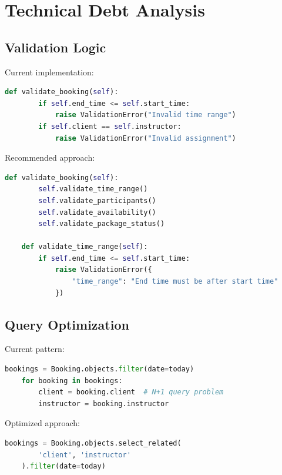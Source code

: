 \section{Technical Debt Analysis}

\begin{tcolorbox}[
    enhanced,
    title={Code Quality Issues},
    attach boxed title to top left,
    boxed title style={
        colback=warning!50,
        colframe=warning!50,
        arc=0mm,
    },
    colback=white,
    colframe=warning!50,
    arc=0mm,
    fonttitle=\bfseries
]
    \subsection{Validation Logic}
    Current implementation:
    \begin{lstlisting}[language=Python]
    def validate_booking(self):
        if self.end_time <= self.start_time:
            raise ValidationError("Invalid time range")
        if self.client == self.instructor:
            raise ValidationError("Invalid assignment")
    \end{lstlisting}
    
    Recommended approach:
    \begin{lstlisting}[language=Python]
    def validate_booking(self):
        self.validate_time_range()
        self.validate_participants()
        self.validate_availability()
        self.validate_package_status()
    
    def validate_time_range(self):
        if self.end_time <= self.start_time:
            raise ValidationError({
                "time_range": "End time must be after start time"
            })
    \end{lstlisting}

    \subsection{Query Optimization}
    Current pattern:
    \begin{lstlisting}[language=Python]
    bookings = Booking.objects.filter(date=today)
    for booking in bookings:
        client = booking.client  # N+1 query problem
        instructor = booking.instructor
    \end{lstlisting}
    
    Optimized approach:
    \begin{lstlisting}[language=Python]
    bookings = Booking.objects.select_related(
        'client', 'instructor'
    ).filter(date=today)
    \end{lstlisting}
\end{tcolorbox}

